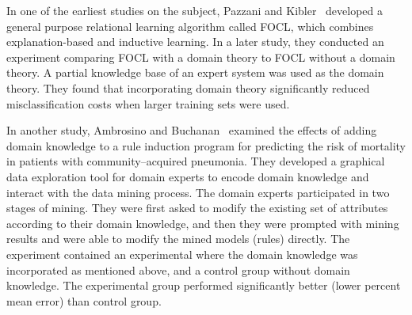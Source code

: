 
In one of the earliest studies on the subject, Pazzani and Kibler~\cite{Pazzani1992} developed a general purpose relational learning algorithm called FOCL, which combines explanation-based and inductive learning. In a later study, they conducted an experiment comparing FOCL with a domain theory to FOCL without a domain theory. A partial knowledge base of an expert system was used as the domain theory. They found that incorporating domain theory significantly reduced misclassification costs when larger training sets were used.

In another study, Ambrosino and Buchanan~\cite{Ambrosino1999} examined the effects of adding domain knowledge to a rule induction program for predicting the risk of mortality in patients with community--acquired pneumonia. They developed a graphical data exploration tool for domain experts to encode domain knowledge and interact with the data mining process. The domain experts participated in two stages of mining. They were first asked to modify the existing set of attributes according to their domain knowledge, and then they were prompted with mining results and were able to modify the mined models (rules) directly. The experiment contained an experimental where the domain knowledge was incorporated as mentioned above, and a control group without domain knowledge. The experimental group performed significantly better (lower percent mean error) than control group.

